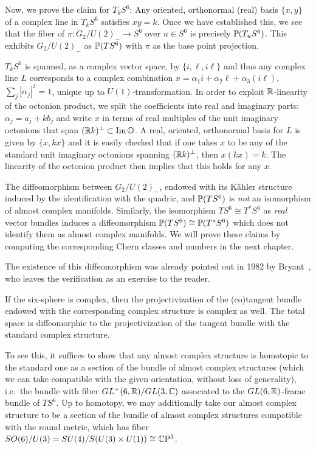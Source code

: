 \begin{myproof}
	Now, we prove the claim for $T_k S^6$: Any oriented, orthonormal (real) basis $\{x,y\}$ of a complex line in $T_k S^6$ satisfies $xy=k$. Once we have established this, we see that the fiber of $\pi:G_2/U(2)_-\to S^6$ over $u\in S^6$ is precisely $\P(T_u S^6)$. This exhibits $G_2/U(2)_-$ as $\P(TS^6)$ with $\pi$ as the base point projection. 
	
	$T_kS^6$ is spanned, as a complex vector space, by $\{i,\ell,i\ell\}$ and thus any complex line $L$ corresponds to a complex combination $x=\alpha_1 i+\alpha_2 \ell+ \alpha_3 (i\ell)$, $\sum_j|\alpha_j|^2=1$, unique up to $U(1)$-transformation. In order to exploit $\R$-linearity of the octonion product, we split the coefficients into real and imaginary parts: $\alpha_j=a_j+kb_j$ and write $x$ in terms of real multiples of the unit imaginary octonions that span $(\R k)^\perp\subset \Im\O$. A real, oriented, orthonormal basis for $L$ is given by $\{x,kx\}$ and it is easily checked that if one takes $x$ to be any of the standard unit imaginary octonions spanning $(\R k)^\perp$, then $x(kx)=k$. The linearity of the octonion product then implies that this holds for any $x$.
\end{myproof}

\begin{rem}\leavevmode
	\begin{numberedlist}
		\item The diffeomorphism between $G_2/U(2)_-$, endowed with its K\"ahler structure induced by the identification with the quadric, and $\P(TS^6)$ is \emph{not} an isomorphism of almost complex manifolds. Similarly, the isomorphism $TS^6\cong T^*S^6$ as \emph{real} vector bundles induces a diffeomorphism $\P(TS^6)\cong \P(T^*S^6)$ which does not identify them as almost complex manifolds. We will prove these claims by computing the corresponding Chern classes and numbers in the next chapter.
		\item The existence of this diffeomorphism was already pointed out in 1982 by Bryant~\cite[200]{Bry1982}, who leaves the verification as an exercise to the reader.
	\end{numberedlist}
\end{rem}

If the six-sphere is complex, then the projectivization of the (co)tangent bundle endowed with the corresponding complex structure is complex as well. The total space is diffeomorphic to the projectivization of the tangent bundle with the standard complex structure. 

To see this, it suffices to show that any almost complex structure is homotopic to the standard one as a section of the bundle of almost complex structures (which we can take compatible with the given orientation, without loss of generality), i.e.~the bundle with fiber $GL^+(6,\R)/GL(3,\C)$ associated to the $GL(6,\R)$-frame bundle of $TS^6$. Up to homotopy, we may additionally take our almost complex structure to be a section of the bundle of almost complex structures compatible with the round metric, which has fiber $SO(6)/U(3)=SU(4)/S(U(3)\times U(1))\cong \CP^3$. 

